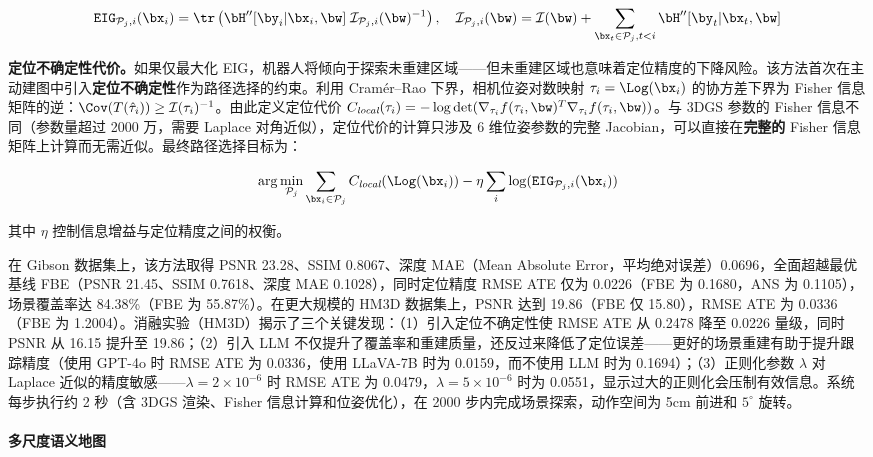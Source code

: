 \begin{equation}
\mathtt{EIG}_{\mathcal{P}_j, i}(\bx_i) = \tr\left( \bH''[\by_i | \bx_i, \bw] \; \mathcal{I}_{\mathcal{P}_j, i}(\bw)^{-1}\right), \quad \mathcal{I}_{\mathcal{P}_j, i}(\bw) = \mathcal{I}(\bw) + \sum_{\bx_t \in \mathcal{P}_j, t < i} \bH''[\by_t | \bx_t, \bw]
\end{equation}

\textbf{定位不确定性代价。}如果仅最大化 EIG，机器人将倾向于探索未重建区域——但未重建区域也意味着定位精度的下降风险。该方法首次在主动建图中引入\textbf{定位不确定性}作为路径选择的约束。利用 Cram\'{e}r--Rao 下界，相机位姿对数映射 $\tau_i = \Log(\bx_i)$ 的协方差下界为 Fisher 信息矩阵的逆：$\Cov(T(\hat{\tau}_i)) \geq \mathcal{I}(\tau_i)^{-1}$。由此定义定位代价 $C_{\textit{local}}(\tau_i) = -\log\det(\nabla_{\tau_i} f(\tau_i, \bw)^T \nabla_{\tau_i} f(\tau_i, \bw))$。与 3DGS 参数的 Fisher 信息不同（参数量超过 2000 万，需要 Laplace 对角近似），定位代价的计算只涉及 6 维位姿参数的完整 Jacobian，可以直接在\textbf{完整的} Fisher 信息矩阵上计算而无需近似。最终路径选择目标为：

\begin{equation}
\arg\min_{\mathcal{P}_j} \sum_{\bx_i \in \mathcal{P}_j} C_{\textit{local}}(\Log(\bx_i)) - \eta \sum_i \log(\mathtt{EIG}_{\mathcal{P}_j,i}(\bx_i))
\end{equation}

其中 $\eta$ 控制信息增益与定位精度之间的权衡。

在 Gibson 数据集上，该方法取得 PSNR 23.28、SSIM 0.8067、深度 MAE（Mean Absolute Error，平均绝对误差）0.0696，全面超越最优基线 FBE（PSNR 21.45、SSIM 0.7618、深度 MAE 0.1028），同时定位精度 RMSE ATE 仅为 0.0226（FBE 为 0.1680，ANS 为 0.1105），场景覆盖率达 84.38\%（FBE 为 55.87\%）。在更大规模的 HM3D 数据集上，PSNR 达到 19.86（FBE 仅 15.80），RMSE ATE 为 0.0336（FBE 为 1.2004）。消融实验（HM3D）揭示了三个关键发现：（1）引入定位不确定性使 RMSE ATE 从 0.2478 降至 0.0226 量级，同时 PSNR 从 16.15 提升至 19.86；（2）引入 LLM 不仅提升了覆盖率和重建质量，还反过来降低了定位误差——更好的场景重建有助于提升跟踪精度（使用 GPT-4o 时 RMSE ATE 为 0.0336，使用 LLaVA-7B 时为 0.0159，而不使用 LLM 时为 0.1694）；（3）正则化参数 $\lambda$ 对 Laplace 近似的精度敏感——$\lambda = 2 \times 10^{-6}$ 时 RMSE ATE 为 0.0479，$\lambda = 5 \times 10^{-6}$ 时为 0.0551，显示过大的正则化会压制有效信息。系统每步执行约 2 秒（含 3DGS 渲染、Fisher 信息计算和位姿优化），在 2000 步内完成场景探索，动作空间为 5cm 前进和 $5^\circ$ 旋转。

\paragraph{多尺度语义地图}

